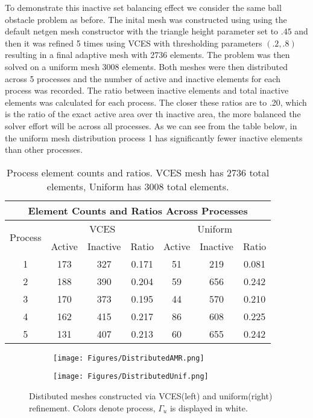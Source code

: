 \documentclass[12 pt]{report}
\begin{document}
To demonstrate this inactive set balancing effect we consider the same ball obstacle problem as before. The inital mesh was constructed using  using the default netgen mesh constructor with the triangle height parameter set to $.45$ and then it was refined 5 times using VCES with thresholding parameters $(.2, .8)$ resulting in a final adaptive mesh with 2736 elements. The problem was then solved on a uniform mesh 3008 elements. Both meshes were then distributed across 5 processes and the number of active and inactive elements for each process was recorded. The ratio between inactive elements and total inactive elements was calculated for each process. The closer these ratios are to .20, which is the ratio of the exact active area over th inactive area, the more balanced the solver effort will be across all processes. As we can see from the table below, in the uniform mesh distribution process 1 has significantly fewer inactive elements than other processes. 


\begin{table}[H]
  \centering
  \label{tab:element_counts}
  \begin{tabular}{|c|c|c|c|c|c|c|} \hline
    \multicolumn{7}{|c|}{Element Counts and Ratios Across Processes} \\ \hline
    \multirow{2}{*}{Process} & \multicolumn{3}{c|}{VCES} & \multicolumn{3}{c|}{Uniform} \\ \cline{2-7}
    & Active & Inactive & Ratio & Active & Inactive & Ratio \\ \hline
    1 & 173 & 327 & 0.171 & 51 & 219 & 0.081 \\ \hline
    2 & 188 & 390 & 0.204 & 59 & 656 & 0.242 \\ \hline
    3 & 170 & 373 & 0.195 & 44 & 570 & 0.210 \\ \hline
    4 & 162 & 415 & 0.217 & 86 & 608 & 0.225 \\ \hline
    5 & 131 & 407 & 0.213 & 60 & 655 & 0.242 \\ \hline
  \end{tabular}
  \caption{Process element counts and ratios. VCES mesh has 2736 total elements, Uniform has 3008 total elements.}
\end{table}

\begin{figure}[H]
  \centering
  \begin{subfigure}[b]{0.45\textwidth}
      \centering
      \texttt{[image: Figures/DistributedAMR.png]}
      \label{fig:image1}
  \end{subfigure}
  \hfill
  \begin{subfigure}[b]{0.45\textwidth}
      \centering
      \texttt{[image: Figures/DistributedUnif.png]}
      \label{fig:image2}
  \end{subfigure}
  \vspace*{.25cm}
  \caption{Distibuted meshes constructed via VCES(left) and uniform(right) refinement. Colors denote process, $\Gamma_u$ is displayed in white.}
  \label{fig:two_images}
\end{figure}
\end{document}
